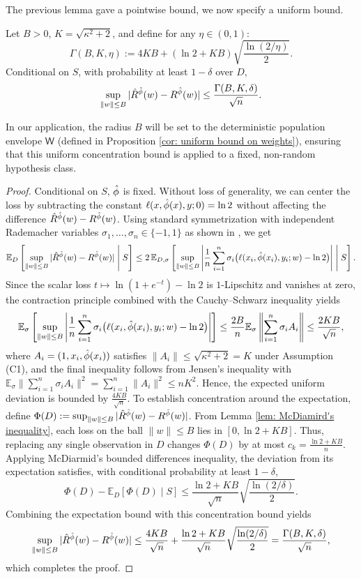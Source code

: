 The previous lemma gave a pointwise bound, we now specify a uniform bound.
\begin{lem}\label{lem: uniform ball deviation}
Let $B>0$, $K=\sqrt{\kappa^2+2}$, and define for any $\eta \in (0,1)$:
\[
\Gamma(B,K,\eta):=4KB+(\ln2+KB)\sqrt{\frac{\ln(2/\eta)}2}.
\]
Conditional on $S$, with probability at least $1-\delta$ over $D$,
\[
\sup_{\|w\|\leq B}|\hat{R}^{\hat{\phi}}(w)-R^{\hat{\phi}}(w)|
\leq\frac{\Gamma(B,K,\delta)}{\sqrt n}.
\]
\end{lem}
\begin{rem}
In our application, the radius $B$ will be set to the deterministic population envelope $\mathsf{W}$ (defined in Proposition \ref{cor: uniform bound on weights}), ensuring that this uniform concentration bound is applied to a fixed, non-random hypothesis class.
\end{rem}
\begin{proof}
Conditional on $S$, $\hat{\phi}$ is fixed. Without loss of generality, we can center the loss by subtracting the constant $\ell(x,\hat{\phi}(x),y;0)=\ln2$ without affecting the difference $\hat{R}^{\hat{\phi}}(w)-R^{\hat{\phi}}(w)$. Using standard symmetrization with independent Rademacher variables $\sigma_1,\dots,\sigma_n\in\{-1,1\}$ as shown in \cite[Thm 26.2]{shalev-shwartz_ben-david_2014}, we get
\[
\mathbb{E}_D\left[\sup_{\|w\|\leq B}|\hat{R}^{\hat{\phi}}(w)-R^{\hat{\phi}}(w)| \;\middle|\; S\right]
\leq 2\,\mathbb{E}_{D,\sigma}\left[\sup_{\|w\|\leq B}\left|\frac{1}{n}\sum_{i=1}^n\sigma_i\big(\ell(x_i,\hat{\phi}(x_i),y_i;w)-\ln2\big)\right|\;\middle|\; S\right].
\]
Since the scalar loss $t\mapsto\ln(1+e^{-t})-\ln2$ is $1$-Lipschitz and vanishes at zero, the contraction principle combined with the Cauchy--Schwarz inequality yields
\[
\mathbb{E}_\sigma\left[\sup_{\|w\|\leq B}\left|\frac{1}{n}\sum_{i=1}^n\sigma_i\big(\ell(x_i,\hat{\phi}(x_i),y_i;w)-\ln2\big)\right|\right]
\leq \frac{2B}{n}\mathbb{E}_\sigma\left\|\sum_{i=1}^n\sigma_i A_i\right\|
\leq \frac{2KB}{\sqrt{n}},
\]
where $A_i=(1,x_i,\hat{\phi}(x_i))$ satisfies $\|A_i\|\leq\sqrt{\kappa^2+2}=K$ under Assumption (C1), and the final inequality follows from Jensen's inequality with $\mathbb{E}_\sigma\|\sum_{i=1}^n\sigma_i A_i\|^2=\sum_{i=1}^n\|A_i\|^2\leq nK^2$. Hence, the expected uniform deviation is bounded by $\frac{4KB}{\sqrt{n}}$.
To establish concentration around the expectation, define $\Phi(D):=\sup_{\|w\|\leq B}|\hat{R}^{\hat{\phi}}(w)-R^{\hat{\phi}}(w)|$. From Lemma \ref{lem: McDiamird's inequality}, each loss on the ball $\|w\|\leq B$ lies in $[0,\ln2+KB]$. Thus, replacing any single observation in $D$ changes $\Phi(D)$ by at most $c_k=\frac{\ln2+KB}{n}$. Applying McDiarmid's bounded differences inequality, the deviation from its expectation satisfies, with conditional probability at least $1-\delta$,
\[
\Phi(D) - \mathbb{E}_D[\Phi(D)\mid S] \leq \frac{\ln2+KB}{\sqrt{n}}\sqrt{\frac{\ln(2/\delta)}{2}}.
\]
Combining the expectation bound with this concentration bound yields
\[
\sup_{\|w\|\leq B}|\hat{R}^{\hat{\phi}}(w)-R^{\hat{\phi}}(w)| \leq \frac{4KB}{\sqrt{n}} + \frac{\ln2+KB}{\sqrt{n}}\sqrt{\frac{\ln(2/\delta)}{2}} = \frac{\Gamma(B,K,\delta)}{\sqrt{n}},
\]
which completes the proof.
\end{proof}

